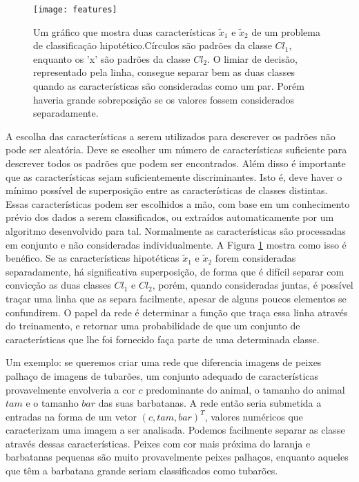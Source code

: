 \begin{figure}[!ht]
\centering
\texttt{[image: features]}
\caption[Um gráfico que mostra duas características $\tilde{x}_1$ e $\tilde{x}_2$ de um problema de classificação hipotético.]{Um gráfico que mostra duas características $\tilde{x}_1$ e $\tilde{x}_2$ de um problema de classificação hipotético.\protect\footnotemark  Círculos são padrões da classe $Cl_1$, enquanto os 'x' são padrões da classe $Cl_2$. O limiar de decisão, representado pela linha, consegue separar bem as duas classes quando as características são consideradas como um par. Porém haveria grande sobreposição se os valores fossem considerados separadamente.}
\label{fig:features}
\centering
\end{figure}
A escolha das características a serem utilizados para descrever os padrões não pode ser aleatória. Deve se escolher um número de características suficiente para descrever todos os padrões que podem ser encontrados. Além disso é importante que as características sejam suficientemente discriminantes. Isto é, deve haver o mínimo possível de superposição entre as características de classes distintas. Essas características podem ser escolhidos a mão, com base em um conhecimento prévio dos dados a serem classificados, ou extraídos automaticamente por um algoritmo desenvolvido para tal. Normalmente as características são processadas em conjunto e não consideradas individualmente. A Figura \ref{fig:features} mostra como isso é benéfico. Se as características hipotéticas $\tilde{x}_1$ e $\tilde{x}_2$ forem consideradas separadamente, há significativa superposição, de forma que é difícil separar com convicção as duas classes $Cl_1$ e $Cl_2$, porém, quando consideradas juntas, é possível traçar uma linha que as separa facilmente, apesar de alguns poucos elementos se confundirem. O papel da rede é determinar a função que traça essa linha através do treinamento, e retornar uma probabilidade de que um conjunto de características que lhe foi fornecido faça parte de uma determinada classe.



Um exemplo: se queremos criar uma rede que diferencia imagens de peixes palhaço de imagens de tubarões, um conjunto adequado de características provavelmente envolveria a cor $c$ predominante do animal, o tamanho do animal $tam$ e o tamanho $bar$ das suas barbatanas. A rede então seria submetida a entradas na forma de um vetor $(c, tam, bar)^T$, valores numéricos que caracterizam uma imagem a ser analisada. Podemos facilmente separar as classe através dessas características. Peixes com cor mais próxima do laranja e barbatanas pequenas são muito provavelmente peixes palhaços, enquanto aqueles que têm a barbatana grande seriam classificados como tubarões.


